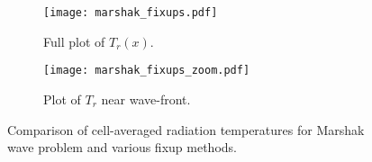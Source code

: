 \begin{figure}
\begin{subfigure}{0.7\textwidth}
  \centering
    \texttt{[image: marshak\_fixups.pdf]}
    \caption{\label{fig:marshak_fix_full} Full plot of $T_r(x)$.}
\end{subfigure}
\vspace{0.2in}
\begin{subfigure}{0.7\textwidth}
  \centering
  \texttt{[image: marshak\_fixups\_zoom.pdf]}
  \caption{\label{fig:marshak_fix_zoom} Plot of $T_r$ near wave-front.}
\end{subfigure}
    \centering
    \caption{\label{fig:marshak_fix}Comparison of cell-averaged radiation temperatures for
Marshak wave problem and various fixup methods.}
\end{figure}

